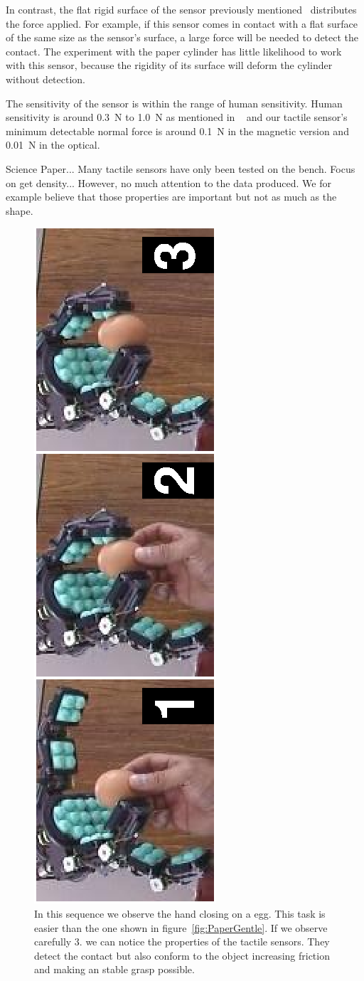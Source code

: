 In contrast, the flat rigid surface of the sensor previously
mentioned~\cite{touchsensorScience} distributes the force applied.
For example, if this sensor comes in contact with a flat surface
of the same size as the sensor's surface, a large force will be
needed to detect the contact. The experiment with the paper
cylinder has little likelihood to work with this sensor, because
the rigidity of its surface will deform the cylinder without
detection.

The sensitivity of the sensor is within the range of human
sensitivity. Human sensitivity is around 0.3~N to 1.0~N as
mentioned in ~\cite{touchsensorScience} and our tactile sensor's
minimum detectable normal force is around 0.1~N in the magnetic
version and 0.01~N in the optical.


Science Paper... Many tactile sensors have only been tested on the
bench. Focus on get density... However, no much attention to the
data produced. We for example believe that those properties are
important but not as much as the shape.
%


\begin{figure}[tbp]
\centerline{
\includegraphics[height=\columnwidth, angle=270 ]{./figures/EggSeq.eps}
} \caption[Grabbing an egg]{In this sequence we observe the hand
closing on a egg. This task is easier than the one shown in
figure~\ref{fig:PaperGentle}. If we observe carefully 3. we can
notice the properties of the tactile sensors. They detect the
contact but also conform to the object increasing friction and
making an stable grasp possible.} \label{fig:TouchEgg}
\end{figure}

